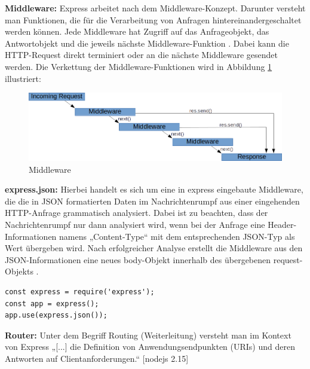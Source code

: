 \noindent
\textbf{Middleware:}
Express arbeitet nach dem Middleware-Konzept. Darunter versteht man Funktionen, die für die Verarbeitung von Anfragen hintereinandergeschaltet werden können. Jede Middleware hat Zugriff auf das Anfrageobjekt, das Antwortobjekt und die jeweils nächste Middleware-Funktion \cite{Node1.9}.
Dabei kann die HTTP-Request direkt terminiert oder an die nächste Middleware gesendet werden. Die Verkettung der Middleware-Funktionen wird in Abbildung \ref{fig:middleware} illustriert:
\newline

\begin{figure}[tbt]
\centering
\includegraphics[width=12cm]{images/nodejs_middleware.png}
\caption[Middleware]{Middleware \cite{Node1.2}}
\label{fig:middleware}
\end{figure}

%
%

\noindent
\textbf{express.json:}
Hierbei handelt es sich um eine in express eingebaute Middleware, die die in JSON formatierten Daten im Nachrichtenrumpf aus einer eingehenden HTTP-Anfrage grammatisch analysiert.  Dabei ist zu beachten, dass der Nachrichtenrumpf nur dann analysiert wird, wenn bei der Anfrage eine Header-Informationen namens „Content-Type“ mit dem entsprechenden JSON-Typ als Wert übergeben wird. Nach erfolgreicher Analyse erstellt die Middleware aus den JSON-Informationen eine neues body-Objekt innerhalb des übergebenen request-Objekts \cite{Node2.1}.
\newline

\begin{lstlisting}[caption=Express.json Middleware benutzen,label=lst:ExpressNutzen]
const express = require('express');
const app = express();
app.use(express.json());
\end{lstlisting}

%
%

\noindent
\textbf{Router:}
Unter dem Begriff Routing (Weiterleitung) versteht man im Kontext von Express „[...] die Definition von Anwendungsendpunkten (URIs) und deren Antworten auf Clientanforderungen.“ [nodejs 2.15]
\newline

